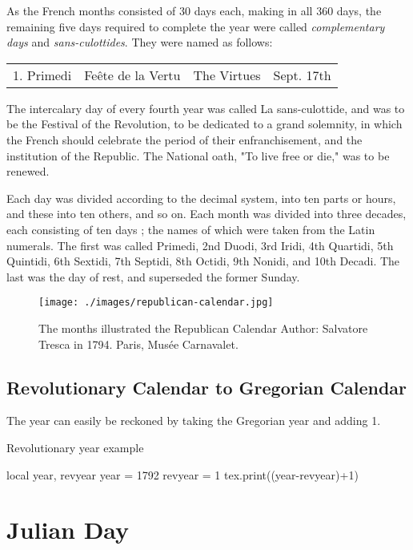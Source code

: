 As the French months consisted of 30 days each, making in all 360 days, the remaining five days required to complete the year were called \textit{complementary days} and \textit{sans-culottides}. They were named as follows:

\begin{tabular}{llll}
1. Primedi  & Fe\^ete de la Vertu  & The Virtues & Sept. 17th \\
\end{tabular}

The intercalary day of every fourth year was called La  sans-culottide, and was to be the Festival of 
the Revolution,  to be dedicated to a grand solemnity, in which the French should celebrate the period of their enfranchisement, and the  institution of the Republic. The National oath, "To live  free or die," was to be renewed. 

Each day was divided according to the decimal system, 
into ten parts or hours, and these into ten others, and so on. 
Each month was divided into three decades, each consisting of ten days ; 
the names of which were taken from the 
Latin numerals. The first was called Primedi, 2nd Duodi, 3rd 
Iridi, 4th Quartidi, 5th Quintidi, 6th Sextidi, 7th Septidi, 8th 
Octidi, 9th Nonidi, and 10th Decadi. The last was the day 
of rest, and superseded the former Sunday. 

\begin{figure}[htp]
\centering
\texttt{[image: ./images/republican-calendar.jpg]}
\caption{The months illustrated the Republican Calendar  
Author: Salvatore Tresca in 1794. 
Paris, Musée Carnavalet. }
\end{figure}

\subsection{Revolutionary Calendar to Gregorian Calendar}

The year can easily be reckoned by taking the Gregorian year and adding 1. 

\begin{texexample}{Revolutionary year example}{}
\begin{luacode}
  local year, revyear
  year = 1792
  revyear = 1
  tex.print((year-revyear)+1)
\end{luacode}
\end{texexample}


\section{Julian Day}








 
  
    



